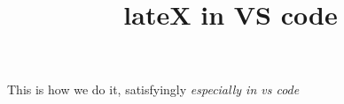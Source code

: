 \documentclass{article}
\title{lateX in VS code}
\begin{document}
\maketitle
This is how we do it, satisfyingly
\emph{especially in vs code}
\end{document}
